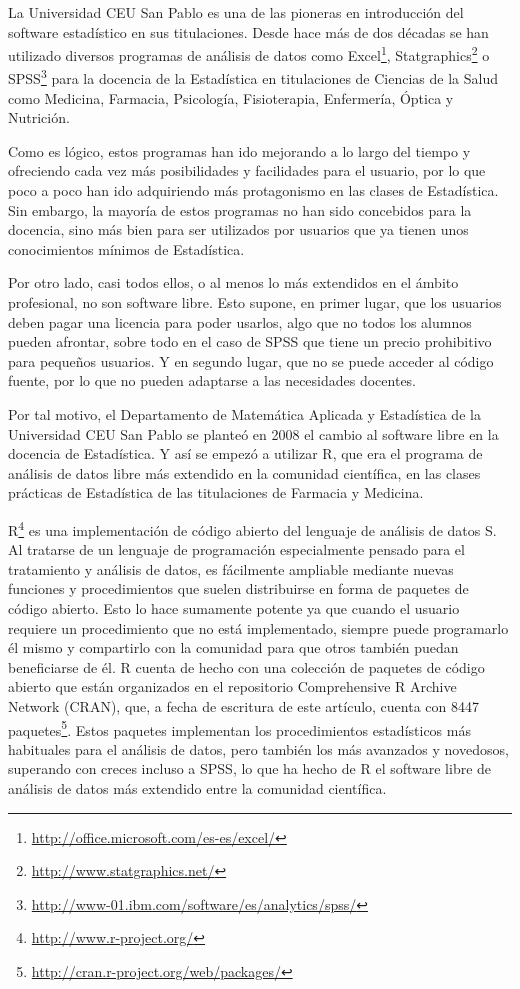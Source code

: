 \documentclass[a4paper,10pt,twoside]{article}
\newcommand{\spss}{\textsf{SPSS}}
\newcommand{\statgraphics}{\textsf{Statgraphics}}
\begin{document}
La Universidad CEU San Pablo es una de las pioneras en introducción del software estadístico en sus titulaciones. 
Desde hace más de dos décadas se han utilizado diversos programas de análisis de datos como
\textsf{Excel}\footnote{\url{http://office.microsoft.com/es-es/excel/}},
\statgraphics{}\footnote{\url{http://www.statgraphics.net/}} o
\spss{}\footnote{\url{http://www-01.ibm.com/software/es/analytics/spss/}} para la docencia de la Estadística en
titulaciones de Ciencias de la Salud como Medicina, Farmacia, Psicología, Fisioterapia, Enfermería, Óptica y Nutrición.

Como es lógico, estos programas han ido mejorando a lo largo del tiempo y ofreciendo cada vez más posibilidades y
facilidades para el usuario, por lo que poco a poco han ido adquiriendo más protagonismo en las clases de Estadística.
Sin embargo, la mayoría de estos programas no han sido concebidos para la docencia, sino más bien para ser utilizados
por usuarios que ya tienen unos conocimientos mínimos de Estadística.

Por otro lado, casi todos ellos, o al menos lo más extendidos en el ámbito profesional, no son software libre.
Esto supone, en primer lugar, que los usuarios deben pagar una licencia para poder usarlos, algo que no todos los
alumnos pueden afrontar, sobre todo en el caso de \spss{} que tiene un precio prohibitivo para pequeños usuarios.
Y en segundo lugar, que no se puede acceder al código fuente, por lo que no pueden adaptarse a las necesidades docentes.

Por tal motivo, el Departamento de Matemática Aplicada y Estadística de la Universidad CEU San Pablo se
planteó en 2008 el cambio al software libre en la docencia de Estadística.
Y así se empezó a utilizar R, que era el programa de análisis de datos libre más extendido en la comunidad
científica, en las clases prácticas de Estadística de las titulaciones de Farmacia y Medicina.

R\footnote{\url{http://www.r-project.org/}} \cite{r2001language} es una implementación de código abierto del
lenguaje de análisis de datos S.
Al tratarse de un lenguaje de programación especialmente pensado para el tratamiento y análisis de datos, es fácilmente
ampliable mediante nuevas funciones y procedimientos que suelen distribuirse en forma de paquetes de código abierto.
Esto lo hace sumamente potente ya que cuando el usuario requiere un procedimiento que no está implementado, siempre
puede programarlo él mismo y compartirlo con la comunidad para que otros también puedan beneficiarse de él.
R cuenta de hecho con una colección de paquetes de código abierto que están organizados en el repositorio Comprehensive
R Archive Network (CRAN), que, a fecha de escritura de este artículo, cuenta con 8447
paquetes\footnote{\url{http://cran.r-project.org/web/packages/}}.
Estos paquetes implementan los procedimientos estadísticos más habituales para el análisis de datos, pero también los
más avanzados y novedosos, superando con creces incluso a \spss{}, lo que ha hecho de R el software libre de análisis de
datos más extendido entre la comunidad científica.
\end{document}
